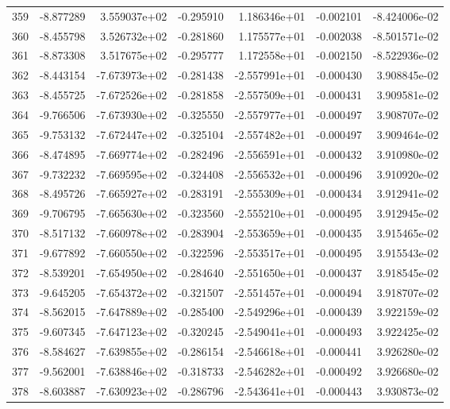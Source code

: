 \begin{tabular}{rrrrrrr}
 359 &  -8.877289 &  3.559037e+02 & -0.295910 &  1.186346e+01 &   -0.002101 & -8.424006e-02 \\
 360 &  -8.455798 &  3.526732e+02 & -0.281860 &  1.175577e+01 &   -0.002038 & -8.501571e-02 \\
 361 &  -8.873308 &  3.517675e+02 & -0.295777 &  1.172558e+01 &   -0.002150 & -8.522936e-02 \\
 362 &  -8.443154 & -7.673973e+02 & -0.281438 & -2.557991e+01 &   -0.000430 &  3.908845e-02 \\
 363 &  -8.455725 & -7.672526e+02 & -0.281858 & -2.557509e+01 &   -0.000431 &  3.909581e-02 \\
 364 &  -9.766506 & -7.673930e+02 & -0.325550 & -2.557977e+01 &   -0.000497 &  3.908707e-02 \\
 365 &  -9.753132 & -7.672447e+02 & -0.325104 & -2.557482e+01 &   -0.000497 &  3.909464e-02 \\
 366 &  -8.474895 & -7.669774e+02 & -0.282496 & -2.556591e+01 &   -0.000432 &  3.910980e-02 \\
 367 &  -9.732232 & -7.669595e+02 & -0.324408 & -2.556532e+01 &   -0.000496 &  3.910920e-02 \\
 368 &  -8.495726 & -7.665927e+02 & -0.283191 & -2.555309e+01 &   -0.000434 &  3.912941e-02 \\
 369 &  -9.706795 & -7.665630e+02 & -0.323560 & -2.555210e+01 &   -0.000495 &  3.912945e-02 \\
 370 &  -8.517132 & -7.660978e+02 & -0.283904 & -2.553659e+01 &   -0.000435 &  3.915465e-02 \\
 371 &  -9.677892 & -7.660550e+02 & -0.322596 & -2.553517e+01 &   -0.000495 &  3.915543e-02 \\
 372 &  -8.539201 & -7.654950e+02 & -0.284640 & -2.551650e+01 &   -0.000437 &  3.918545e-02 \\
 373 &  -9.645205 & -7.654372e+02 & -0.321507 & -2.551457e+01 &   -0.000494 &  3.918707e-02 \\
 374 &  -8.562015 & -7.647889e+02 & -0.285400 & -2.549296e+01 &   -0.000439 &  3.922159e-02 \\
 375 &  -9.607345 & -7.647123e+02 & -0.320245 & -2.549041e+01 &   -0.000493 &  3.922425e-02 \\
 376 &  -8.584627 & -7.639855e+02 & -0.286154 & -2.546618e+01 &   -0.000441 &  3.926280e-02 \\
 377 &  -9.562001 & -7.638846e+02 & -0.318733 & -2.546282e+01 &   -0.000492 &  3.926680e-02 \\
 378 &  -8.603887 & -7.630923e+02 & -0.286796 & -2.543641e+01 &   -0.000443 &  3.930873e-02 \\

\end{tabular}
